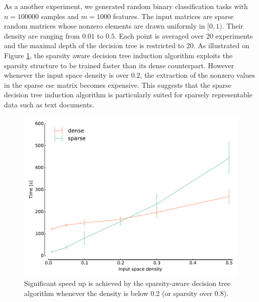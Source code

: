 As a another experiment, we generated random binary classification tasks with
$n=100000$ samples and $m=1000$ features. The input matrices are sparse random
matrices whose nonzero elements are drawn uniformly in $[0, 1)$. Their density
are ranging from $0.01$ to $0.5$. Each point is averaged over 20 experiments
and the maximal depth of the decision tree is restricted to 20. As illustrated
on Figure \ref{fig:density}, the sparsity aware decision tree induction
algorithm exploits the sparsity structure to be trained faster than its dense
counterpart. However whenever the input space density is over $0.2$, the
extraction of the nonzero values in the sparse csc matrix becomes expensive.
This suggests that the sparse decision tree induction algorithm is particularly
suited for sparsely representable data such as text documents.

\begin{figure}[h]
\centering
\includegraphics[scale=0.45]{images/density.pdf}
\caption{Significant speed up is achieved by the sparsity-aware decision tree
         algorithm whenever the density is below 0.2 (or sparsity over 0.8).}
\label{fig:density}
\end{figure}